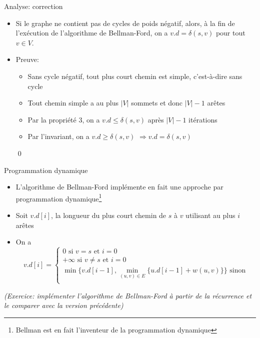 \begin{frame}{Analyse: correction}

\begin{itemize}
\item Si le graphe ne contient pas de cycles de poids négatif, alors,
  à la fin de l'exécution de l'algorithme de Bellman-Ford, on a
  $v.d=\delta(s,v)$ pour tout $v\in V$.

\bigskip

\item Preuve:
\begin{itemize}
\item Sans cycle négatif, tout plus court chemin est \alert{simple}, c'est-à-dire sans cycle
\item Tout chemin simple a au plus $|V|$ sommets et donc $|V|-1$ arêtes
\item Par la propriété 3, on a $v.d\leq \delta(s,v)$ après 
$|V|-1$ itérations
\item Par l'invariant, on a $v.d\geq \delta(s,v)$ $\Rightarrow v.d=\delta(s,v)$
\end{itemize}\qed
\end{itemize}
\end{frame}


\begin{frame}{Programmation dynamique}

\begin{itemize}
\item L'algorithme de Bellman-Ford implémente en fait une approche par
  programmation dynamique\footnote{Bellman est en fait l'inventeur de la programmation dynamique}
\item Soit $v.d[i]$, la longueur du plus court chemin de $s$ à $v$ utilisant au plus $i$ arêtes
\item On a
{\footnotesize
\[v.d[i]=\left\{\begin{array}{l}
0 \mbox{   si }v=s\mbox{ et }i=0\\
+\infty \mbox{   si }v\neq s\mbox{ et }i=0\\
\min\{v.d[i-1],\min_{(u,v)\in E}\{u.d[i-1]+w(u,v)\}\} \mbox{   sinon}\\
  \end{array}\right.\]}
\end{itemize}

\bigskip

{\it (Exercice: implémenter l'algorithme de Bellman-Ford à partir de
  la récurrence et le comparer avec la version précédente)}

\end{frame}

